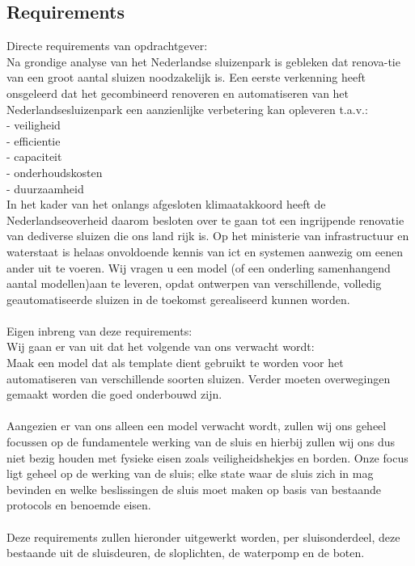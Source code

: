 \documentclass{article}
\begin{document}
	\subsection{Requirements}
	Directe requirements van opdrachtgever:\\
	Na grondige analyse van het Nederlandse sluizenpark is gebleken dat renova-tie van een groot aantal sluizen noodzakelijk is.  Een eerste verkenning heeft onsgeleerd dat het gecombineerd renoveren en automatiseren van het Nederlandsesluizenpark een aanzienlijke verbetering kan opleveren t.a.v.:\\
	- veiligheid\\
	- efficientie\\
	- capaciteit\\
	- onderhoudskosten\\
	- duurzaamheid\\
	In het kader van het onlangs afgesloten klimaatakkoord heeft de Nederlandseoverheid  daarom  besloten  over te gaan tot een ingrijpende renovatie van dediverse sluizen die ons land rijk is. Op het ministerie van infrastructuur en waterstaat is helaas onvoldoende kennis van ict en systemen aanwezig om eenen ander uit te voeren. Wij vragen u een model (of een onderling samenhangend aantal modellen)aan  te leveren, opdat ontwerpen van verschillende, volledig geautomatiseerde sluizen in de toekomst gerealiseerd kunnen worden.\\\\
	Eigen inbreng van deze requirements:\\
	Wij gaan er van uit dat het volgende van ons verwacht wordt:\\
	Maak een model dat als template dient gebruikt te worden voor het automatiseren van verschillende soorten sluizen. Verder moeten overwegingen gemaakt worden die goed onderbouwd zijn.\\\\ Aangezien er van ons alleen een model verwacht wordt, zullen wij ons geheel focussen op de fundamentele werking van de sluis en hierbij zullen wij ons dus niet bezig  houden met fysieke eisen zoals veiligheidshekjes en borden. Onze focus ligt geheel op de werking van de sluis; elke state waar de sluis zich in mag bevinden en welke beslissingen de sluis moet maken op basis van bestaande protocols en benoemde eisen. \\\\
	Deze requirements zullen hieronder uitgewerkt worden, per sluisonderdeel, deze bestaande uit de sluisdeuren, de sloplichten, de waterpomp en de boten.\\
	
\end{document}
